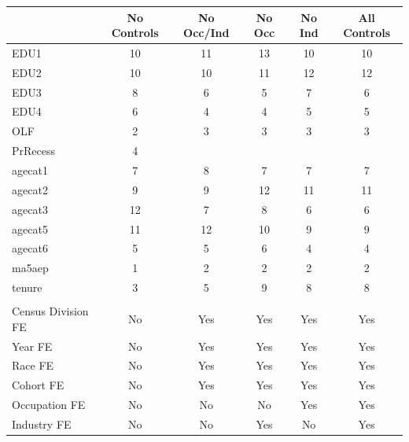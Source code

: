 \begin{tabular}{lccccc}
\hline\hline
  & No Controls & No Occ/Ind & No Occ & No Ind & All Controls \\
\hline
EDU1&10&11&13&10&10\\
EDU2&10&10&11&12&12\\
EDU3&8&6&5&7&6\\
EDU4&6&4&4&5&5\\
OLF&2&3&3&3&3\\
PrRecess&4&&&&\\
agecat1&7&8&7&7&7\\
agecat2&9&9&12&11&11\\
agecat3&12&7&8&6&6\\
agecat5&11&12&10&9&9\\
agecat6&5&5&6&4&4\\
ma5aep&1&2&2&2&2\\
tenure&3&5&9&8&8\\
\hline
\multicolumn{6}{l}{} \\
Census Division FE & No & Yes & Yes & Yes & Yes \\
Year FE & No & Yes & Yes & Yes & Yes \\
Race FE & No & Yes & Yes & Yes & Yes \\
Cohort FE & No & Yes & Yes & Yes & Yes \\
Occupation FE & No & No & No & Yes & Yes \\
Industry FE & No & No & Yes & No & Yes \\
\hline\hline
\end{tabular}
